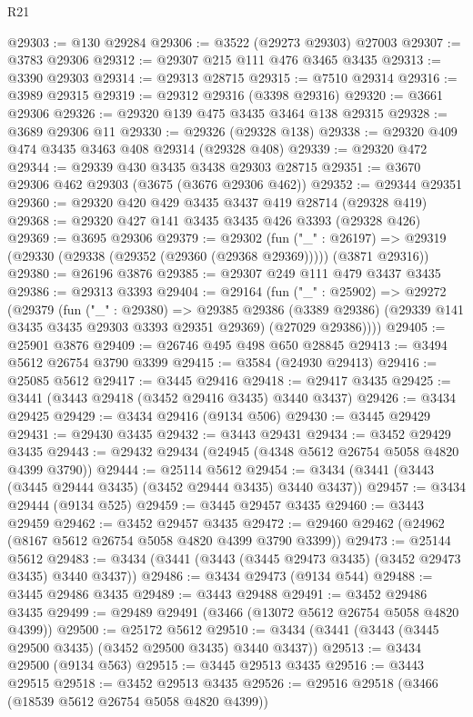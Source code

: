 \begin{lexlean}{R21}
\begin{coremodule}
@29303 := @130 @29284
@29306 := @3522 (@29273 @29303) @27003
@29307 := @3783 @29306
@29312 := @29307 @215 @111 @476 @3465 @3435
@29313 := @3390 @29303
@29314 := @29313 @28715
@29315 := @7510 @29314
@29316 := @3989 @29315
@29319 := @29312 @29316 (@3398 @29316)
@29320 := @3661 @29306
@29326 := @29320 @139 @475 @3435 @3464 @138 @29315
@29328 := @3689 @29306 @11
@29330 := @29326 (@29328 @138)
@29338 := @29320 @409 @474 @3435 @3463 @408 @29314 (@29328 @408)
@29339 := @29320 @472
@29344 := @29339 @430 @3435 @3438 @29303 @28715
@29351 := @3670 @29306 @462 @29303 (@3675 (@3676 @29306 @462))
@29352 := @29344 @29351
@29360 := @29320 @420 @429 @3435 @3437 @419 @28714 (@29328 @419)
@29368 := @29320 @427 @141 @3435 @3435 @426 @3393 (@29328 @426)
@29369 := @3695 @29306
@29379 := @29302
    (fun ("_" : @26197) =>
    @29319 (@29330 (@29338 (@29352 (@29360 (@29368 @29369))))) (@3871 @29316))
@29380 := @26196 @3876
@29385 := @29307 @249 @111 @479 @3437 @3435
@29386 := @29313 @3393
@29404 := @29164
    (fun ("_" : @25902) =>
    @29272
      (@29379
        (fun ("_" : @29380) =>
        @29385
          @29386
          (@3389 @29386)
          (@29339 @141 @3435 @3435 @29303 @3393 @29351 @29369)
          (@27029 @29386))))
@29405 := @25901 @3876
@29409 := @26746 @495 @498 @650 @28845
@29413 := @3494 @5612 @26754 @3790 @3399
@29415 := @3584 (@24930 @29413)
@29416 := @25085 @5612
@29417 := @3445 @29416
@29418 := @29417 @3435
@29425 := @3441 (@3443 @29418 (@3452 @29416 @3435) @3440 @3437)
@29426 := @3434 @29425
@29429 := @3434 @29416 (@9134 @506)
@29430 := @3445 @29429
@29431 := @29430 @3435
@29432 := @3443 @29431
@29434 := @3452 @29429 @3435
@29443 := @29432 @29434 (@24945 (@4348 @5612 @26754 @5058 @4820 @4399 @3790))
@29444 := @25114 @5612
@29454 := @3434 (@3441 (@3443 (@3445 @29444 @3435) (@3452 @29444 @3435) @3440 @3437))
@29457 := @3434 @29444 (@9134 @525)
@29459 := @3445 @29457 @3435
@29460 := @3443 @29459
@29462 := @3452 @29457 @3435
@29472 := @29460 @29462 (@24962 (@8167 @5612 @26754 @5058 @4820 @4399 @3790 @3399))
@29473 := @25144 @5612
@29483 := @3434 (@3441 (@3443 (@3445 @29473 @3435) (@3452 @29473 @3435) @3440 @3437))
@29486 := @3434 @29473 (@9134 @544)
@29488 := @3445 @29486 @3435
@29489 := @3443 @29488
@29491 := @3452 @29486 @3435
@29499 := @29489 @29491 (@3466 (@13072 @5612 @26754 @5058 @4820 @4399))
@29500 := @25172 @5612
@29510 := @3434 (@3441 (@3443 (@3445 @29500 @3435) (@3452 @29500 @3435) @3440 @3437))
@29513 := @3434 @29500 (@9134 @563)
@29515 := @3445 @29513 @3435
@29516 := @3443 @29515
@29518 := @3452 @29513 @3435
@29526 := @29516 @29518 (@3466 (@18539 @5612 @26754 @5058 @4820 @4399))

\end{coremodule}
\end{lexlean}
